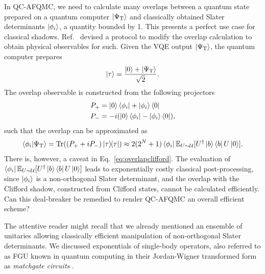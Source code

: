 \documentclass[../main.tex]{subfiles}
\begin{document}
In QC-AFQMC, we need to calculate many overlaps between a quantum state prepared on a quantum computer $\ket{\Psi_\mathrm{T}}$ and classically obtained Slater determinants $\ket{\phi_i}$, a quantity bounded by 1. This presents a perfect use case for classical shadows.    Ref.~\cite{huggins2022unbiasing} devised a protocol to modify the overlap calculation to obtain physical observables for such. Given the VQE output $\ket{\Psi_\mathrm{T}}$, the quantum computer prepares
\begin{equation}\label{eq:initstate}
    \ket{\tau} = \frac{\ket{0} + \ket{\Psi_\mathrm{T}}}{\sqrt{2}}.
\end{equation} The overlap observable is constructed from the following projectors
\begin{align}
    P_+ &= \ket{0} \bra{\phi_i} + \ket{\phi_i}\bra{0} \\
    P_- &= -i(\ket{0} \bra{\phi_i} - \ket{\phi_i}\bra{0}),
\end{align} such that the overlap can be approximated as
\begin{equation}\label{eq:overlapclifford}
    \braket{\phi_i}{\Psi_\mathrm{T}} = \Tr ((P_+ + i P_-)\ketbra{\tau}) \approx 2(2^N + 1) \bra{\phi_i} \mathbb{E}_{U \sim \mathcal{U}}[U^\dagger \ket{b}\bra{b} U \ket{0}].
\end{equation} There is, however, a caveat in  Eq.~\ref{eq:overlapclifford}.  The evaluation of  $\bra{\phi_i} \mathbb{E}_{U \sim \mathcal{U}}[U^\dagger \ket{b}\bra{b} U \ket{0}]$ leads to exponentially costly classical post-processing, since $\ket{\phi_i}$ is a non-orthogonal Slater determinant, and the overlap with the Clifford shadow, constructed from Clifford states, cannot be calculated efficiently. Can this deal-breaker be remedied to render QC-AFQMC an overall efficient scheme?

The attentive reader might recall that we already mentioned an ensemble of unitaries allowing classically efficient manipulation of non-orthogonal Slater determinants. We discussed exponentials of single-body operators, also referred to as \ac{FGU} known in quantum computing in their Jordan-Wigner transformed form as \textit{matchgate circuits} \cite{jozsa2008matchgates}.
\end{document}
